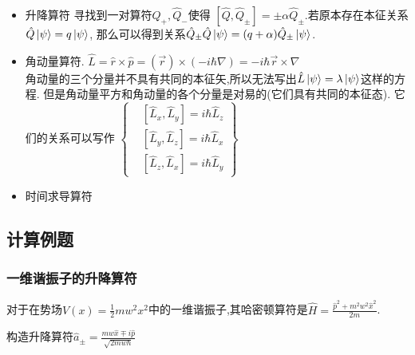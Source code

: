 \documentclass[UTF8,a4paper,10pt]{ctexart}
\begin{document}
\begin{itemize}
\item 升降算符
寻找到一对算符$\hat{Q}_{+},\hat{Q}_{-}$使得
$[\hat{Q},\hat{Q}_{\pm}]=\pm\alpha\hat{Q}_{\pm}$.若原本存在本征关系$\hat{Q}\Ket{\psi}=q\Ket{\psi}$,
那么可以得到关系$\hat{Q}_{\pm}\hat{Q}\Ket{\psi}=(q+\alpha)\hat{Q}_{\pm}\Ket{\psi}$.\newline

\item 角动量算符.
 $\hat{L}=\hat{r}\times\hat{p}=(\vec{r})\times(-i\hbar\nabla)=-i\hbar\vec{r}\times\nabla$\\
 角动量的三个分量并不具有共同的本征矢,所以无法写出$\hat{L}\Ket{\psi}=\lambda\Ket{\psi}$这样的方程.
 但是角动量平方和角动量的各个分量是对易的(它们具有共同的本征态).
它们的关系可以写作
\(
    \left\{
        \begin{aligned}
        &[\hat{L}_{x},\hat{L}_{y}]=i\hbar\hat{L}_{z}\\
        &[\hat{L}_{y},\hat{L}_{z}]=i\hbar\hat{L}_{x}\\
        &[\hat{L}_{z},\hat{L}_{x}]=i\hbar\hat{L}_{y}
        \end{aligned}
    \right\}
\)

\item 时间求导算符

\end{itemize}
\subsection{计算例题}

\subsubsection{一维谐振子的升降算符}
对于在势场$V(x)=\frac{1}{2}mw^2x^2$中的一维谐振子,其哈密顿算符是$\hat{H}=\frac{\hat{p}^2+m^2w^2\hat{x}^2}{2m}$.\newline

构造升降算符$\hat{a}_{\pm}=\frac{mw\hat{x}\mp i\hat{p}}{\sqrt{2mw\hbar}}$
\end{document}
